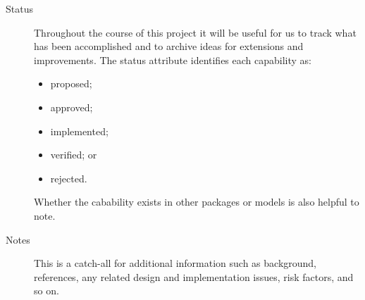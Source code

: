 \begin{description}
\item [Status] Throughout the course of this project it will be 
useful for us to track what has been accomplished and to archive 
ideas for extensions and improvements.  The status attribute identifies
each capability as:
\begin{itemize}
\item proposed;
\item approved; 
\item implemented; 
\item verified; or
\item rejected.  
\end{itemize}
Whether the cabability exists in other packages or models
is also helpful to note.

\item [Notes] This is a catch-all for additional information such
as background, references, any related design and implementation issues, 
risk factors, and so on.

\end{description}
